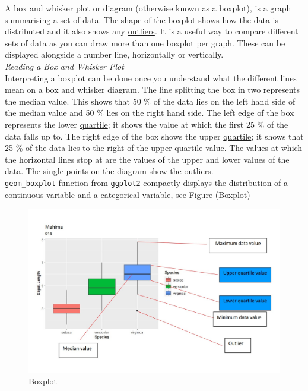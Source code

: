 \documentclass[
]{book}
\begin{document}
A box and whisker plot or diagram (otherwise known as a boxplot), is a graph summarising a set of data. The shape of the boxplot shows how the data is distributed and it also shows any \href{https://www.ncl.ac.uk/webtemplate/ask-assets/external/maths-resources/statistics/descriptive-statistics/other-measures-of-dispersion.html\#Outliers}{outliers}. It is a useful way to compare different sets of data as you can draw more than one boxplot per graph. These can be displayed alongside a number line, horizontally or vertically.\\
\emph{Reading a Box and Whisker Plot}\\
Interpreting a boxplot can be done once you understand what the different lines mean on a box and whisker diagram. The line splitting the box in two represents the median value. This shows that 50 \% of the data lies on the left hand side of the median value and 50 \% lies on the right hand side. The left edge of the box represents the lower \href{https://www.ncl.ac.uk/webtemplate/ask-assets/external/maths-resources/statistics/descriptive-statistics/other-measures-of-dispersion.html\#Quartiles}{quartile}; it shows the value at which the first 25 \% of the data falls up to. The right edge of the box shows the upper \href{https://www.ncl.ac.uk/webtemplate/ask-assets/external/maths-resources/statistics/descriptive-statistics/other-measures-of-dispersion.html\#Quartiles}{quartile}; it shows that 25 \% of the data lies to the right of the upper quartile value. The values at which the horizontal lines stop at are the values of the upper and lower values of the data. The single points on the diagram show the outliers.\\
\texttt{geom\_boxplot} function from \texttt{ggplot2} compactly displays the distribution of a continuous variable and a categorical variable, see Figure (Boxplot)

\begin{figure}

{\centering \includegraphics[width=1\linewidth]{pictures/boxplot} 

}

\caption{Boxplot}\label{fig:unnamed-chunk-50}
\end{figure}
\end{document}
